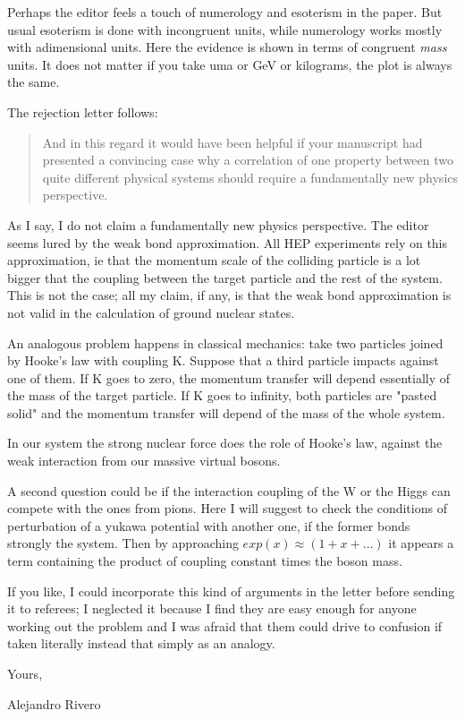 \documentclass{letter}
\begin{document}
Perhaps the editor feels a touch of numerology and esoterism in the paper.
But usual esoterism is done with incongruent units, while numerology works
mostly with adimensional units. Here the evidence is shown in terms of
congruent {\it mass} units. It does not matter if you take uma or GeV or
kilograms, the plot is always the same.

The rejection letter follows:

\begin{quote}
And in this regard it would have been helpful if
your manuscript had presented a convincing case why a correlation of
one property between two quite different physical systems should
require a fundamentally new physics perspective.
\end{quote}

As I say, I do not claim a fundamentally new physics perspective.
The editor seems lured by the weak bond approximation. All HEP
experiments rely on this approximation, ie that the momentum scale
of the colliding particle is a lot bigger that the coupling between
the target particle and the rest of the system. This is not the case;
all my claim, if any, is that the weak bond approximation is not
valid in the calculation of ground nuclear states.

An analogous problem happens in classical mechanics: take two particles
joined by Hooke's law with coupling K. Suppose that a third particle impacts
against one of them. If K goes to zero, the momentum transfer will
depend essentially of the mass of the target particle. If K goes to
infinity, both particles are "pasted solid" and the momentum transfer
will depend of the mass of the whole system.

In our system the strong nuclear force does the role of Hooke's law,
against the weak interaction from our massive virtual bosons.

A second question could be if the interaction coupling of the
W or the Higgs can compete with the ones from pions. Here I will
suggest to check the conditions of perturbation of a yukawa potential
with another one, if the former bonds strongly the system. Then
by approaching $exp(x)\approx (1+x+...)$ it appears a term
containing the product of coupling constant times the boson mass.

If you like, I could incorporate this kind of arguments in the letter before
sending it to referees; I neglected it because I find they are easy enough for
anyone working out the problem and I was afraid that them could drive to
confusion if taken literally instead that simply as an analogy.

Yours,

Alejandro Rivero
\end{document}
